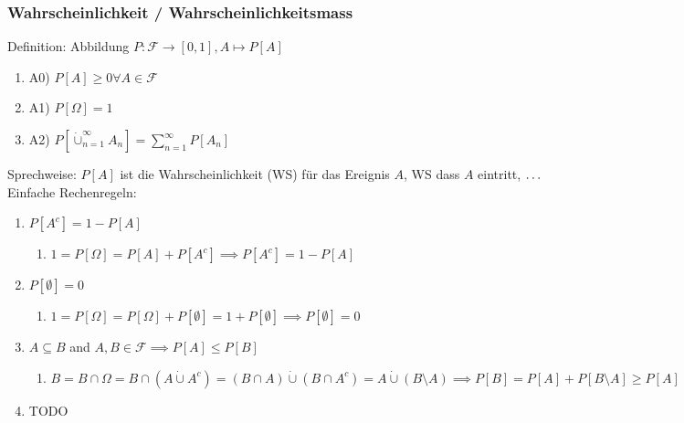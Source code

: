 \documentclass[10pt]{article}
\newcommand{\enumstart}{\begin{enumerate}}
\newcommand{\enumend}{\end{enumerate}}
\newcommand{\F}{\mathcal{F}}
\begin{document}
\subsubsection{Wahrscheinlichkeit / Wahrscheinlichkeitsmass}
Definition: Abbildung $P: \F \rightarrow [0,1], A \mapsto P[A]$
\enumstart
	\item A0) $P[A] \ge 0 \forall A \in \F$
	\item A1) $P[\Omega] = 1$
	\item A2) $P[\dot\cup_{n = 1}^{\infty}A_n] = \sum_{n = 1}^{\infty}P[A_n]$
\enumend
Sprechweise: $P[A]$ ist die Wahrscheinlichkeit (WS) für das Ereignis $A$, WS dass $A$ eintritt, $\mathellipsis$\\
Einfache Rechenregeln:
\enumstart
	\item $P[A^c] = 1 - P[A]$
	\enumstart
		\item $1 = P[\Omega] = P[A] + P[A^c] \implies P[A^c] = 1 - P[A]$
	\enumend
	\item $P[\emptyset] = 0$
	\enumstart
		\item $1 = P[\Omega] = P[\Omega] + P[\emptyset] = 1 + P[\emptyset]\implies P[\emptyset] = 0$
	\enumend
	\item $A \subseteq B$ and $A,B \in \F \implies P[A] \le P[B]$
	\enumstart
		\item $B = B \cap \Omega = B \cap (A \dot\cup A^c) = (B \cap A) \dot\cup (B \cap A^c) = A \dot\cup (B \setminus A) \implies P[B] = P[A] + P[B \setminus A] \ge P[A]$
	\enumend
	\item TODO
\enumend
%
\end{document}
